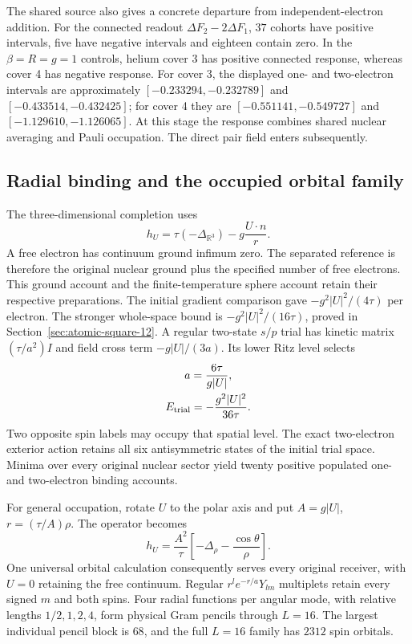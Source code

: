 The shared source also gives a concrete departure from independent-electron addition. For the connected readout $\Delta F_2-2\Delta F_1$, $37$ cohorts have positive intervals, five have negative intervals and eighteen contain zero. In the $\beta=R=g=1$ controls, helium cover 3 has positive connected response, whereas cover 4 has negative response. For cover 3, the displayed one- and two-electron intervals are approximately $[-0.233294,-0.232789]$ and $[-0.433514,-0.432425]$; for cover 4 they are $[-0.551141,-0.549727]$ and $[-1.129610,-1.126065]$. At this stage the response combines shared nuclear averaging and Pauli occupation. The direct pair field enters subsequently.

\subsection{Radial binding and the occupied orbital family}

The three-dimensional completion uses
\[
 h_U=\tau(-\Delta_{\mathbb R^3})-g\frac{U\cdot n}{r}.
\]
A free electron has continuum ground infimum zero. The separated reference is therefore the original nuclear ground plus the specified number of free electrons. This ground account and the finite-temperature sphere account retain their respective preparations. The initial gradient comparison gave $-g^2|U|^2/(4\tau)$ per electron. The stronger whole-space bound is $-g^2|U|^2/(16\tau)$, proved in Section~\ref{sec:atomic-square-12}. A regular two-state $s/p$ trial has kinetic matrix $(\tau/a^2)I$ and field cross term $-g|U|/(3a)$. Its lower Ritz level selects
\[
\begin{gathered}
a=\frac{6\tau}{g|U|},\\
 E_{\rm trial}=-\frac{g^2|U|^2}{36\tau}.
\end{gathered}
\]
Two opposite spin labels may occupy that spatial level. The exact two-electron exterior action retains all six antisymmetric states of the initial trial space. Minima over every original nuclear sector yield twenty positive populated one- and two-electron binding accounts. 

For general occupation, rotate $U$ to the polar axis and put $A=g|U|$, $r=(\tau/A)\rho$. The operator becomes
\[
 h_U=\frac{A^2}{\tau}\left[-\Delta_\rho-\frac{\cos\theta}{\rho}\right].
\]
One universal orbital calculation consequently serves every original receiver, with $U=0$ retaining the free continuum. Regular $r^l e^{-r/a}Y_{lm}$ multiplets retain every signed $m$ and both spins. Four radial functions per angular mode, with relative lengths $1/2,1,2,4$, form physical Gram pencils through $L=16$. The largest individual pencil block is $68$, and the full $L=16$ family has $2312$ spin orbitals. 

